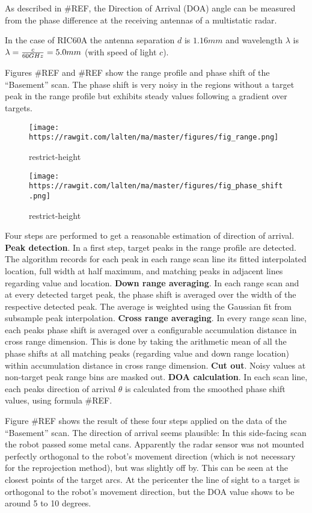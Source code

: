 As described in \#REF, the Direction of Arrival (DOA) angle can be
measured from the phase difference at the receiving antennas of a
multistatic radar.

In the case of RIC60A the antenna separation \(d\) is \(1.16mm\) and
wavelength \(\lambda\) is \(\lambda={c\over{60GHz}}=5.0mm\) (with speed
of light \(c\)).

Figures \#REF and \#REF show the range profile and phase shift of the
``Basement'' scan. The phase shift is very noisy in the regions without
a target peak in the range profile but exhibits steady values following
a gradient over targets.

\begin{figure}
\centering
\texttt{[image: https://rawgit.com/lalten/ma/master/figures/fig\_range.png]}
\caption{restrict-height}
\end{figure}

\begin{figure}
\centering
\texttt{[image: https://rawgit.com/lalten/ma/master/figures/fig\_phase\_shift.png]}
\caption{restrict-height}
\end{figure}

Four steps are performed to get a reasonable estimation of direction of
arrival. \textbf{Peak detection}. In a first step, target peaks in the
range profile are detected. The algorithm records for each peak in each
range scan line its fitted interpolated location, full width at half
maximum, and matching peaks in adjacent lines regarding value and
location. \textbf{Down range averaging}. In each range scan and at every
detected target peak, the phase shift is averaged over the width of the
respective detected peak. The average is weighted using the Gaussian fit
from subsample peak interpolation. \textbf{Cross range averaging}. In
every range scan line, each peaks phase shift is averaged over a
configurable accumulation distance in cross range dimension. This is
done by taking the arithmetic mean of all the phase shifts at all
matching peaks (regarding value and down range location) within
accumulation distance in cross range dimension. \textbf{Cut out}. Noisy
values at non-target peak range bins are masked out. \textbf{DOA
calculation}. In each scan line, each peaks direction of arrival
\(\theta\) is calculated from the smoothed phase shift values, using
formula \#REF.

Figure \#REF shows the result of these four steps applied on the data of
the ``Basement'' scan. The direction of arrival seems plausible: In this
side-facing scan the robot passed some metal cans. Apparently the radar
sensor was not mounted perfectly orthogonal to the robot's movement
direction (which is not necessary for the reprojection method), but was
slightly off by. This can be seen at the closest points of the target
arcs. At the pericenter the line of sight to a target is orthogonal to
the robot's movement direction, but the DOA value shows to be around 5
to 10 degrees.

